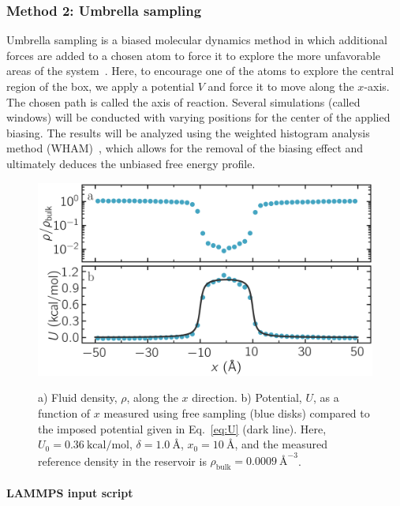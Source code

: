 \documentclass[9pt,tutorial]{livecoms}
\begin{document}
\subsubsection{Method 2: Umbrella sampling}

Umbrella sampling is a biased molecular dynamics method in which
additional forces are added to a chosen atom to force it to explore the
more unfavorable areas of the system~\cite{kastner2011umbrella,
  allen2017computer, frenkel2023understanding}.  Here, to encourage one
of the atoms to explore the central region of the box, we apply a
potential $V$ and force it to move along the $x$-axis. The chosen path
is called the axis of reaction. Several simulations (called windows)
will be conducted with varying positions for the center of the applied
biasing. The results will be analyzed using the weighted histogram
analysis method (WHAM)~\cite{kumar1992weighted,kumar1995multidim}, which
allows for the removal of the biasing effect and ultimately deduces the
unbiased free energy profile.

\begin{figure}
\centering
\includegraphics[width=\linewidth]{US-density}\\[-2ex]
\caption{a) Fluid density, $\rho$, along the $x$ direction.
b) Potential, $U$, as a function of $x$ measured using free sampling (blue disks)
compared to the imposed potential given in Eq.~\eqref{eq:U} (dark line).
Here, $U_0 = 0.36~\text{kcal/mol}$, $\delta = 1.0~\text{\AA{}}$, $x_0 = 10~\text{\AA{}}$,
and the measured reference density in the reservoir is $\rho_\text{bulk} = 0.0009~\text{\AA{}}^{-3}$.} %
\label{fig:US-density}
\end{figure}

\paragraph{LAMMPS input script}
\end{document}
